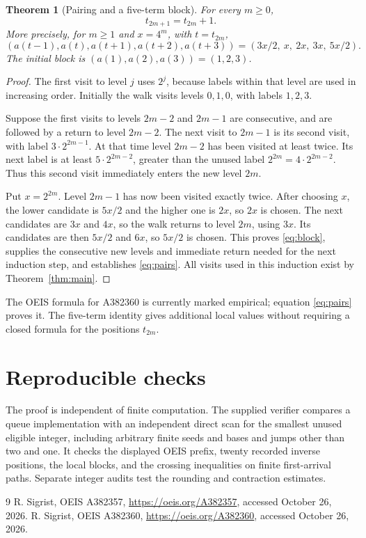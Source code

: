\documentclass[10pt]{article}
\newtheorem{theorem}{Theorem}
\begin{document}
\begin{theorem}[Pairing and a five-term block]\label{thm:pairs}
For every $m\ge0$,
\begin{equation}\label{eq:pairs}
 t_{2m+1}=t_{2m}+1.
\end{equation}
More precisely, for $m\ge1$ and $x=4^m$, with $t=t_{2m}$,
\begin{equation}\label{eq:block}
 (a(t-1),a(t),a(t+1),a(t+2),a(t+3))
   =(3x/2,\ x,\ 2x,\ 3x,\ 5x/2).
\end{equation}
The initial block is $(a(1),a(2),a(3))=(1,2,3)$.
\end{theorem}
\begin{proof}
The first visit to level $j$ uses $2^j$, because labels within that
level are used in increasing order. Initially the walk visits levels
$0,1,0$, with labels $1,2,3$.

Suppose the first visits to levels $2m-2$ and $2m-1$ are consecutive,
and are followed by a return to level $2m-2$. The next visit to
$2m-1$ is its second visit, with label $3\cdot2^{2m-1}$. At that
time level $2m-2$ has been visited at least twice. Its next label is
at least $5\cdot2^{2m-2}$, greater than the unused label
$2^{2m}=4\cdot2^{2m-2}$. Thus this second visit immediately enters
the new level $2m$.

Put $x=2^{2m}$. Level $2m-1$ has now been visited exactly twice.
After choosing $x$, the lower candidate is $5x/2$ and the higher one
is $2x$, so $2x$ is chosen. The next candidates are $3x$ and $4x$,
so the walk returns to level $2m$, using $3x$. Its candidates are
then $5x/2$ and $6x$, so $5x/2$ is chosen. This proves
\eqref{eq:block}, supplies the consecutive new levels and immediate
return needed for the next induction step, and establishes
\eqref{eq:pairs}. All visits used in this induction exist by
Theorem~\ref{thm:main}.
\end{proof}

The OEIS formula for A382360 is currently marked empirical; equation
\eqref{eq:pairs} proves it. The five-term identity gives additional
local values without requiring a closed formula for the positions $t_{2m}$.

\section{Reproducible checks}
The proof is independent of finite computation. The supplied verifier
compares a queue implementation with an independent direct scan for
the smallest unused eligible integer, including arbitrary finite seeds
and bases and jumps other than two and one. It checks the displayed
OEIS prefix, twenty recorded inverse positions, the local blocks, and
the crossing inequalities on finite first-arrival paths. Separate
integer audits test the rounding and contraction estimates.

\begin{thebibliography}{9}
 R. Sigrist, OEIS A382357,
\url{https://oeis.org/A382357}, accessed October 26, 2026.
 R. Sigrist, OEIS A382360,
\url{https://oeis.org/A382360}, accessed October 26, 2026.
\end{thebibliography}
\end{document}
